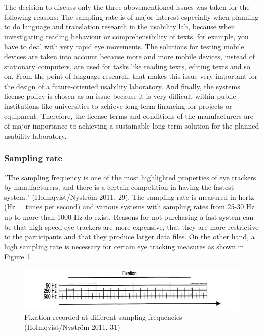 \documentclass[output=paper]{langsci/langscibook}
\begin{document}
The decision to discuss only the three abovementioned issues was taken for the following reasons: The sampling rate is of major interest especially when planning to do language and translation research in the usability lab, because when investigating reading behaviour or comprehensibility of texts, for example, you have to deal with very rapid eye movements. The solutions for testing mobile devices are taken into account because more and more mobile devices, instead of stationary computers, are used for tasks like reading texts, editing texts and so on. From the point of language research, that makes this issue very important for the design of a future-oriented usability laboratory. And finally, the systems license policy is chosen as an issue because it is very difficult within public institutions like universities to achieve long term financing for projects or equipment. Therefore, the license terms and conditions of the manufacturers are of major importance to achieving a sustainable long term solution for the planned usability laboratory.


\subsubsection{Sampling rate}

"The sampling frequency is one of the most highlighted properties of eye trackers by manufacturers, and there is a certain competition in having the fastest system." (Holmqvist/Nyström 2011, 29). The sampling rate is measured in hertz (Hz = times per second) and various systems with sampling rates from 25-30 Hz up to more than 1000 Hz do exist. Reasons for not purchasing a fast system can be that high-speed eye trackers are more expensive, that they are more restrictive to the participants and that they produce larger data files. On the other hand, a high sampling rate is necessary for certain eye tracking measures as shown in Figure \ref{fig:4}.

\begin{figure}
 \includegraphics[width=\textwidth]{figures/Roesener4.png}
 \caption{Fixation recorded at different sampling frequencies (Holmqvist/Nyström 2011, 31)}
 \label{fig:4}
\end{figure} 
\end{document}
